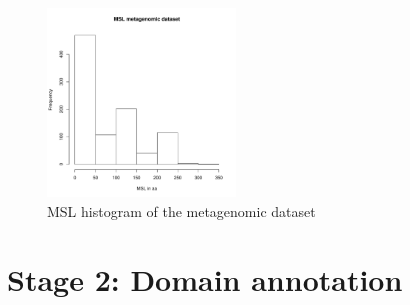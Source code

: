 \documentclass[12pt]{report}
\begin{document}
  \begin{figure}[H]
  \centering
    \includegraphics[width=50mm, scale=0.8]{hist.pdf}
    \caption{MSL histogram of the metagenomic dataset }
        \label{fig:msl_metagenomes}
\end{figure}


\section{Stage 2: Domain annotation}
\label{stage2}
\end{document}
